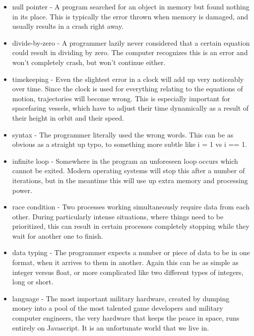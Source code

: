 \documentclass[a4paper]{article}
\begin{document}
\begin{minipage}[t]{0.5\linewidth}
\begin{itemize}[leftmargin=0.5cm]
\item null pointer - A program searched for an object in memory but found nothing in its place. This is typically the error thrown when memory is damaged, and usually results in a crash right away.
\item divide-by-zero - A programmer lazily never considered that a certain equation could result in dividing by zero. The computer recognizes this is an error and won't completely crash, but won't continue either.
\item timekeeping - Even the slightest error in a clock will add up very noticeably over time. Since the clock is used for everything relating to the equations of motion, trajectories will become wrong. This is especially important for spacefaring vessels, which have to adjust their time dynamically as a result of their height in orbit and their speed. 
\item syntax - The programmer literally used the wrong words. This can be as obvious as a straight up typo, to something more subtle like i = 1 vs i == 1.
\item infinite loop - Somewhere in the program an unforeseen loop occurs which cannot be exited. Modern operating systems will stop this after a number of iterations, but in the meantime this will use up extra memory and processing power.
\item race condition - Two processes working simultaneously require data from each other. During particularly intense situations, where things need to be prioritized, this can result in certain processes completely stopping while they wait for another one to finish.
\item data typing - The programmer expects a number or piece of data to be in one format, when it arrives to them in another. Again this can be as simple as integer versus float, or more complicated like two different types of integers, long or short.
\item language - The most important military hardware, created by dumping money into a pool of the most talented game developers and military computer engineers, the very hardware that keeps the peace in space, runs entirely on Javascript. It is an unfortunate world that we live in.
\end{itemize}
\end{minipage} %
\end{document}
